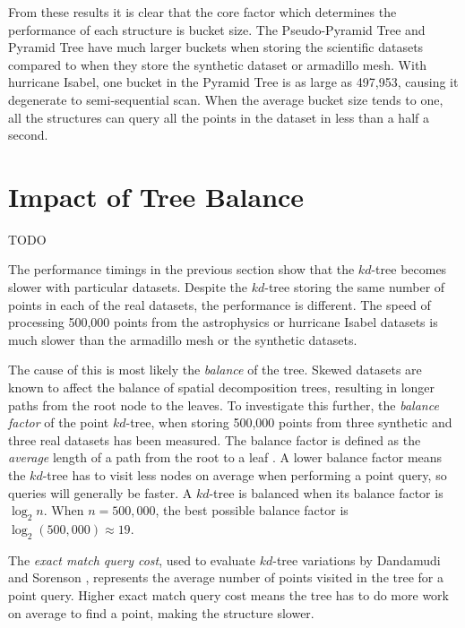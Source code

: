 From these results it is clear that the core factor which determines the performance of each structure is bucket size. The Pseudo-Pyramid Tree and Pyramid Tree have much larger buckets when storing the scientific datasets compared to when they store the synthetic dataset or armadillo mesh. With hurricane Isabel, one bucket in the Pyramid Tree is as large as 497,953, causing it degenerate to semi-sequential scan. When the average bucket size tends to one, all the structures can query all the points in the dataset in less than a half a second.

\section{Impact of Tree Balance}

TODO


The performance timings in the previous section show that the $kd$-tree becomes slower with particular datasets. Despite the $kd$-tree storing the same number of points in each of the real datasets, the performance is different. The speed of processing 500,000 points from the astrophysics or hurricane Isabel datasets is much slower than the armadillo mesh or the synthetic datasets. 

The cause of this is most likely the \textit{balance} of the tree. Skewed datasets are known to affect the balance of spatial decomposition trees, resulting in longer paths from the root node to the leaves. To investigate this further, the \textit{balance factor} of the point $kd$-tree, when storing 500,000 points from three synthetic and three real datasets has been measured. The balance factor is defined as the \textit{average} length of a path from the root to a leaf \cite{kdtree-v-bdtree}. A lower balance factor means the $kd$-tree has to visit less nodes on average when performing a point query, so queries will generally be faster. A $kd$-tree is balanced when its balance factor is $\log_2 n$. When $n = 500,000$, the best possible balance factor is $\log_2 (500,000) \approx 19$.

The \textit{exact match query cost}, used to evaluate $kd$-tree variations by Dandamudi and Sorenson \cite{kdtree-v-bdtree}, represents the average number of points visited in the tree for a point query. Higher exact match query cost means the tree has to do more work on average to find a point, making the structure slower.

